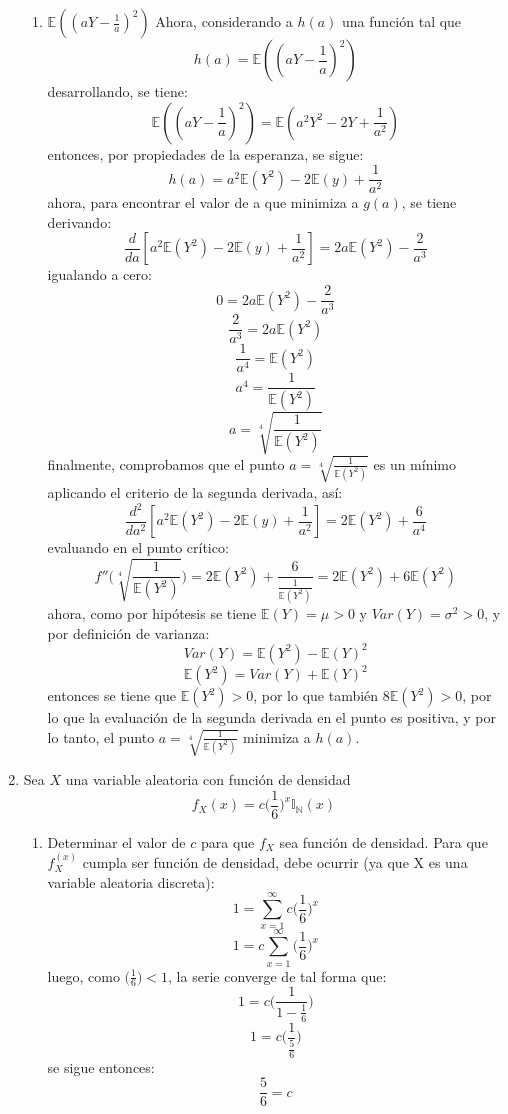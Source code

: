 \documentclass[12pt,a4paper]{report}
\begin{document}
\begin{enumerate}
{\begin{enumerate}
				\item {
					$\mathbb{E}((aY-\frac{1}{a})^2)$
				}
				\newline
				Ahora, considerando a $ h(a) $ una función tal que
					$$ h(a) = \mathbb{E}((aY - \frac{1}{a})^2) $$
				desarrollando, se tiene:
					$$ \mathbb{E}((aY - \frac{1}{a})^2) = \mathbb{E}(a^2Y^2
					 - 2Y + \frac{1}{a^2}) $$
				entonces, por propiedades de la esperanza, se sigue:
					$$ h(a) = a^2\mathbb{E}(Y^2) - 2\mathbb{E}(y)
					 + \frac{1}{a^2} $$
			 	ahora, para encontrar el valor de a que minimiza a $ g(a) $, se
			 	tiene derivando:
			 		$$ \frac{d}{da} [a^2\mathbb{E}(Y^2) - 2\mathbb{E}(y)
					 + \frac{1}{a^2}]
			 	 	 = 2a\mathbb{E}(Y^2) - \frac{2}{a^3} $$
				igualando a cero:
					$$ 0 = 2a\mathbb{E}(Y^2) - \frac{2}{a^3} $$
					$$ \frac{2}{a^3} = 2a\mathbb{E}(Y^2) $$
					$$ \frac{1}{a^4} = \mathbb{E}(Y^2) $$
					$$ a^4 = \frac{1}{\mathbb{E}(Y^2) }$$
					$$ a = \sqrt[4]{ \frac{1}{\mathbb{E}(Y^2) }}$$
				finalmente, comprobamos que el punto $ a = \sqrt[4]{
				\frac{1}{\mathbb{E}(Y^2) }} $ es un mínimo aplicando el criterio
				de la segunda derivada, así:
					$$ \frac{d^2}{da^2}[a^2\mathbb{E}(Y^2) - 2\mathbb{E}(y)
					 + \frac{1}{a^2}] = 2\mathbb{E}(Y^2) + \frac{6}{a^4}$$
				evaluando en el punto crítico:
				    $$ f''\Big( \sqrt[4]{\frac{1}{\mathbb{E}(Y^2)}} \Big)
					 = 2\mathbb{E}(Y^2) + \frac{6}{\frac{1}{\mathbb{E}(Y^2)}}
					 = 2\mathbb{E}(Y^2) + 6\mathbb{E}(Y^2)$$
				ahora, como por hipótesis se tiene $ \mathbb{E}(Y) = \mu > 0 $ y
				$ Var(Y) = \sigma^2 > 0$, y por definición de varianza:
					$$ Var(Y) = \mathbb{E}(Y^2) - \mathbb{E}(Y)^2$$
					$$ \mathbb{E}(Y^2) = Var(Y) + \mathbb{E}(Y)^2$$
				entonces se tiene que $ \mathbb{E}(Y^2) > 0 $, por lo que
				también $ 8\mathbb{E}(Y^2) > 0 $, por lo que la evaluación de la
				segunda derivada en el punto es positiva, y por lo tanto, el
				punto $ a = \sqrt[4]{ \frac{1}{\mathbb{E}(Y^2) }} $ minimiza a
				$h(a)$.
			\end{enumerate}
		}

		\item{
			Sea $X$ una variable aleatoria con función de densidad
			\[f_X(x) = c \Big(\frac{1}{6}\Big)^x \mathbb{I}_{\mathbb{N}}(x)\]
			\begin{enumerate}
				\item {
					Determinar el valor de $c$ para que $f_X$ sea función de
					densidad.
				}
				\newline
				Para que $f_X^{(x)}$ cumpla ser función de densidad, debe
				ocurrir (ya que X es una variable aleatoria discreta):
					$$ 1 = \sum_{x = 1}^{\infty} c\Big(\frac{1}{6}\Big)^x $$
					$$ 1 = c \sum_{x = 1}^{\infty} \Big(\frac{1}{6}\Big)^x $$
				luego, como $ \Big( \frac{1}{6} \Big) < 1$, la serie converge de
				tal forma que:
					$$ 1 = c \Big(\frac{1}{1 - \frac{1}{6} }\Big)  $$
					$$ 1 = c \Big( \frac{1}{\frac{5}{6}} \Big)  $$
				se sigue entonces:
					$$ \frac{5}{6} = c $$


\end{enumerate}}
\end{enumerate}
\end{document}
